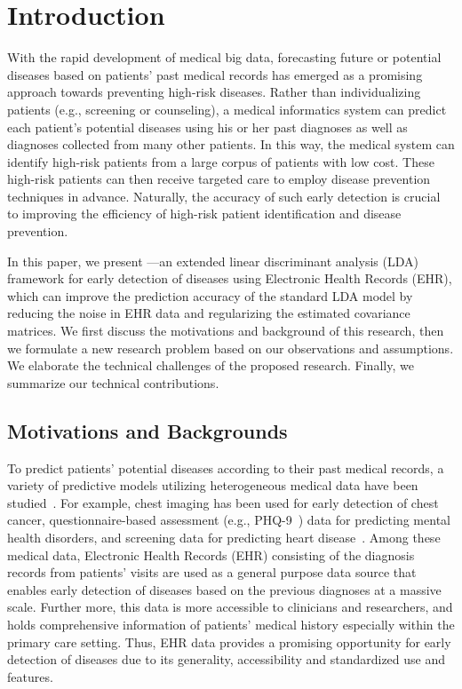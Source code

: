 \section{Introduction}

With the rapid development of medical big data, forecasting future or potential diseases based on patients' past medical records has emerged as a promising approach towards preventing high-risk diseases.
Rather than individualizing patients (e.g., screening or counseling), a medical informatics system can predict each patient's potential diseases using his or her past diagnoses as well as diagnoses collected from many other patients.
In this way, the medical system can identify high-risk patients from a large corpus of patients with low cost.
These high-risk patients can then receive targeted care to employ disease prevention techniques in advance.
Naturally, the accuracy of such early detection is crucial to improving the efficiency of high-risk patient identification and disease prevention.


In this paper, we present \TheName{}---an extended linear discriminant analysis (LDA)~\cite{fisher1936use,mclachlan2004discriminant} framework for early detection of diseases using Electronic Health Records (EHR), which can improve the prediction accuracy of the standard LDA model by reducing the noise in EHR data and regularizing the estimated covariance matrices.
We first discuss the motivations and background of this research, then we formulate a new research problem based on our observations and assumptions.
We elaborate the technical challenges of the proposed research.
Finally, we summarize our technical contributions.
 

\subsection{Motivations and Backgrounds}

To predict patients' potential diseases according to their past medical records, a variety of predictive models utilizing heterogeneous medical data have been studied~\cite{soni2011predictive,palaniappan2008intelligent,kumari2011comparative}.
For example,  chest imaging has been used for early detection of chest cancer, questionnaire-based assessment (e.g., PHQ-9~\cite{kroenke2002phq}) data for predicting mental health disorders, and screening data for predicting heart disease~\cite{d2001validation}.
Among these medical data, Electronic Health Records (EHR) consisting of the diagnosis records from patients' visits are used as a general purpose data source that enables early detection of diseases based on the previous diagnoses at a massive scale.
Further more, this data is more accessible to clinicians and researchers, and holds comprehensive information of patients' medical history especially within the primary care setting.
Thus, EHR data provides a promising opportunity for  early detection of diseases due to its generality, accessibility and standardized use and features.
 

